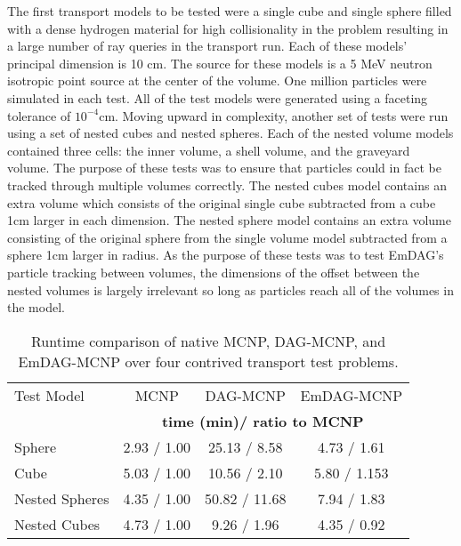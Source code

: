 The first transport models to be tested were a single cube and single sphere
filled with a dense hydrogen material for high collisionality in the problem
resulting in a large number of ray queries in the transport run. Each of these
models' principal dimension is 10 cm. The source for these models is a 5 MeV
neutron isotropic point source at the center of the volume. One million
particles were simulated in each test. All of the test models were generated
using a faceting tolerance of $10^{-4}$cm. Moving upward in complexity, another
set of tests were run using a set of nested cubes and nested spheres. Each of
the nested volume models contained three cells: the inner volume, a shell
volume, and the graveyard volume. The purpose of these tests was to ensure that
particles could in fact be tracked through multiple volumes correctly. The
nested cubes model contains an extra volume which consists of the original
single cube subtracted from a cube 1cm larger in each dimension. The nested
sphere model contains an extra volume consisting of the original sphere from the
single volume model subtracted from a sphere 1cm larger in radius. As the
purpose of these tests was to test EmDAG's particle tracking between volumes, the
dimensions of the offset between the nested volumes is largely irrelevant so
long as particles reach all of the volumes in the model.

\begin{table}[H]
  \small
  \begin{center}

    \begin{tabular}{lccc}

      \toprule
      Test Model & MCNP & DAG-MCNP & EmDAG-MCNP \\
      & \multicolumn{3}{c}{\textbf{time (min)/ ratio to MCNP}} \\
      \hline
      Sphere & 2.93 / 1.00 & 25.13 / 8.58  & 4.73 / 1.61  \\
      Cube & 5.03 / 1.00 & 10.56 / 2.10 & 5.80 / 1.153 \\
      Nested Spheres & 4.35 / 1.00  & 50.82 / 11.68  & 7.94 / 1.83 \\
      Nested Cubes & 4.73 / 1.00 & 9.26 / 1.96 & 4.35 / 0.92 \\
      \bottomrule

    \end{tabular}
  \end{center}
  \caption[Comparative performance results of EmDAG-MCNP.]{Runtime comparison of
    native MCNP, DAG-MCNP, and EmDAG-MCNP over four contrived transport test
    problems.}
      \label{timings}
\end{table}

